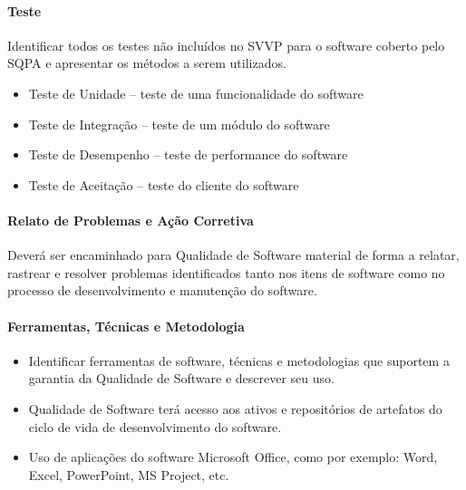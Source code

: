 \paragraph{Teste}

Identificar todos os testes não incluídos no SVVP para o software coberto pelo SQPA e apresentar os métodos a serem utilizados.

\begin{itemize}
\item Teste de Unidade – teste de uma funcionalidade do software

\item Teste de Integração – teste de um módulo do software

\item Teste de Desempenho – teste de performance do software

\item Teste de Aceitação – teste do cliente do software

\end{itemize}



\paragraph{Relato de Problemas e Ação Corretiva}

Deverá ser encaminhado para Qualidade de Software material de forma a relatar, rastrear e resolver problemas identificados tanto nos itens de software como no processo de desenvolvimento e manutenção do software.

\paragraph{Ferramentas, Técnicas e Metodologia}

\begin{itemize}
\item Identificar ferramentas de software, técnicas e metodologias que suportem a garantia da Qualidade de Software e descrever seu uso.

\item Qualidade de Software terá acesso aos ativos e repositórios de artefatos do ciclo de vida de desenvolvimento do software.

\item Uso de aplicações do software Microsoft Office, como por exemplo: Word, Excel, PowerPoint, MS Project, etc.

\end{itemize}

